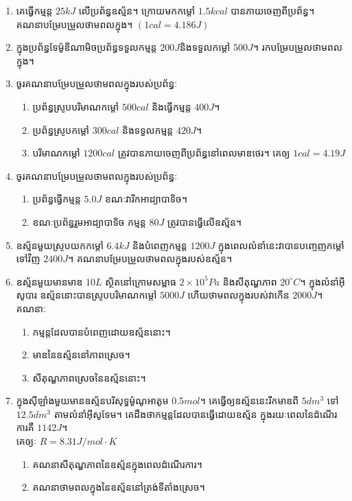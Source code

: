 \begin{enumerate}[m]
\begin{enumerate}[k]
	\end{enumerate}
	\item គេធ្វើកម្មន្ត $25kJ$ លើប្រព័ន្ធឧស្ម័ន។ ក្រោយមកកម្តៅ $1.5kcal$ បានភាយចេញពីប្រព័ន្ធ។ \\គណនាបម្រែបម្រួលថាមពលក្នុង។ $\left(1cal=4.186J\right)$ 
	\item ក្នុងប្រព័ន្ធទែម៉ូឌីណាមិចប្រព័ន្ធទទួលកម្មន្ត $200J$​និងទទួលកម្តៅ $500J$។ រកបម្រែបម្រួលថាមពលក្នុង។
	\item ចូរគណនាបម្រែបម្រួលថាមពលក្នុងរបស់ប្រព័ន្ធៈ
	\begin{enumerate}[k]
		\item ប្រព័ន្ធស្រូបបរិមាណកម្តៅ $500cal$ និងធ្វើកម្មន្ត $400J$។
		\item ប្រព័ន្ធស្រូបកម្តៅ $300cal$ និងទទួលកម្មន្ត $420J$។
		\item បរិមាណកម្តៅ $1200cal$ ត្រូវបានភាយចេញពីប្រព័ន្ធនៅពេលមាឌថេរ។ គេឲ្យ $1cal=4.19J$
	\end{enumerate}
	\item ចូរគណនាបម្រែបម្រួលថាមពលក្នុងរបស់ប្រព័ន្ធៈ
	\begin{enumerate}[k]
		\item ប្រព័ន្ធធ្វើកម្មន្ត $5.0J$ ខណៈវារីកអាដ្យាបាទិច។
		\item ខណៈប្រព័ន្ធរួមអាដ្យាបាទិច កម្មន្ត $80J$ ត្រូវបានធ្វើលើឧស្ម័ន។
	\end{enumerate}
	\item ឧស្ម័នមួយស្រូបយកកម្តៅ $6.4kJ$ និងបំពេញកម្មន្ត $1200J$ ក្នុងពេលលំនាំនេះវាបានបញ្ចេញកម្តៅទៅវិញ $2400J$។ គណនាបម្រែបម្រួលថាមពលក្នុងរបស់ឧស្ម័ន។
	\item ឧស្ម័នមួយមានមាឌ $10L$ ស្ថិតនៅក្រោមសម្ពាធ $2\times10^{5}Pa$ និងសីតុណ្ហភាព $20^\circ C$។ ក្នុងលំនាំអុីសូបារ ឧស្ម័ននោះបានស្រូបបរិមាណកម្តៅ $5000J$ ហើយថាមពលក្នុងរបស់វាកើន $2000J$។ គណនាៈ
	\begin{enumerate}[k,2]
		\item កម្មន្តដែលបានបំពេញដោយឧស្ម័ននោះ។
		\item មាឌនៃឧស្ម័ននៅភាពស្រេច។
		\item សីតុណ្ហភាពស្រេចនៃឧស្ម័ននោះ។
	\end{enumerate} 
	\item ក្នុងសុីឡាំងមួយមានឧស្ម័នបរិសុទ្ធម៉ូណូអាតូម $0.5mol$។ គេធ្វើឲ្យឧស្ម័ននេះរីកមាឌពី $5dm^3$ ទៅ​ $12.5dm^3$ តាមលំនាំអុីសូទែម។ គេដឹងថាកម្មន្តដែលបានធ្វើដោយឧស្ម័ន ក្នុងរយៈពេលនៃដំណើរការគឺ $1142J$។\\គេឲ្យៈ $R=8.31J/mol\cdot K$
	\begin{enumerate}[k]
		\item គណនាសីតុណ្ហភាពនៃឧស្ម័នក្នុងពេលដំណើរការ។
		\item គណនាថាមពលក្នុងនៃឧស្ម័ននៅត្រង់ទីតាំងស្រេច។

\end{enumerate}
\end{enumerate}
